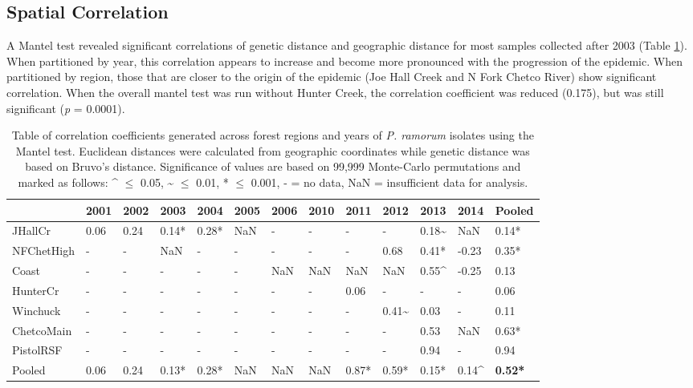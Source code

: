 \documentclass[double,12pt]{beavtex}
\begin{document}
  \subsection{Spatial Correlation}\label{spatial-correlation}
  
  A Mantel test revealed significant correlations of genetic distance and
  geographic distance for most samples collected after 2003 (Table
  \ref{tab:ramorum3}). When partitioned by year, this correlation appears
  to increase and become more pronounced with the progression of the
  epidemic. When partitioned by region, those that are closer to the
  origin of the epidemic (Joe Hall Creek and N Fork Chetco River) show
  significant correlation. When the overall mantel test was run without
  Hunter Creek, the correlation coefficient was reduced (0.175), but was
  still significant (\emph{p} = 0.0001).
  
  \begin{table}
  \centering
  \caption[Table of correlation coefficients generated across
  forest regions and years of \emph{P. ramorum} isolates using the Mantel
  test.]{Table of correlation coefficients generated across
  forest regions and years of \emph{P. ramorum} isolates using the Mantel
  test. Euclidean distances were calculated from geographic coordinates
  while genetic distance was based on Bruvo's distance. Significance of
  values are based on 99,999 Monte-Carlo permutations and marked as
  follows: \^{} $\leq$ 0.05, \~{} $\leq$ 0.01, * $\leq$ 0.001, - = no data, NaN =
  insufficient data for analysis.}
  \label{tab:ramorum3}
  \begin{tabular}{@{}lllllllllllll@{}}
  \toprule
  & \textbf{2001} & \textbf{2002} & \textbf{2003} & \textbf{2004} &
  \textbf{2005} & \textbf{2006} & \textbf{2010} & \textbf{2011} &
  \textbf{2012} & \textbf{2013} & \textbf{2014} &
  \textbf{Pooled}\tabularnewline
  \midrule
  JHallCr & 0.06 & 0.24 & 0.14* & 0.28* & NaN & - & - & - & - & 0.18\~{}
  & NaN & 0.14*\tabularnewline
  NFChetHigh & - & - & NaN & - & - & - & - & - & 0.68 & 0.41* & -0.23 &
  0.35*\tabularnewline
  Coast & - & - & - & - & - & NaN & NaN & NaN & NaN & 0.55\^{} & -0.25 &
  0.13\tabularnewline
  HunterCr & - & - & - & - & - & - & - & 0.06 & - & - & - &
  0.06\tabularnewline
  Winchuck & - & - & - & - & - & - & - & - & 0.41\~{} & 0.03 & - &
  0.11\tabularnewline
  ChetcoMain & - & - & - & - & - & - & - & - & - & 0.53 & NaN &
  0.63*\tabularnewline
  PistolRSF & - & - & - & - & - & - & - & - & - & 0.94 & - &
  0.94\tabularnewline
  Pooled & 0.06 & 0.24 & 0.13* & 0.28* & NaN & NaN & NaN & 0.87* &
  0.59* & 0.15* & 0.14\^{} & \textbf{0.52*}\tabularnewline
  \bottomrule
  \end{tabular}
  \end{table}
  
\end{document}
